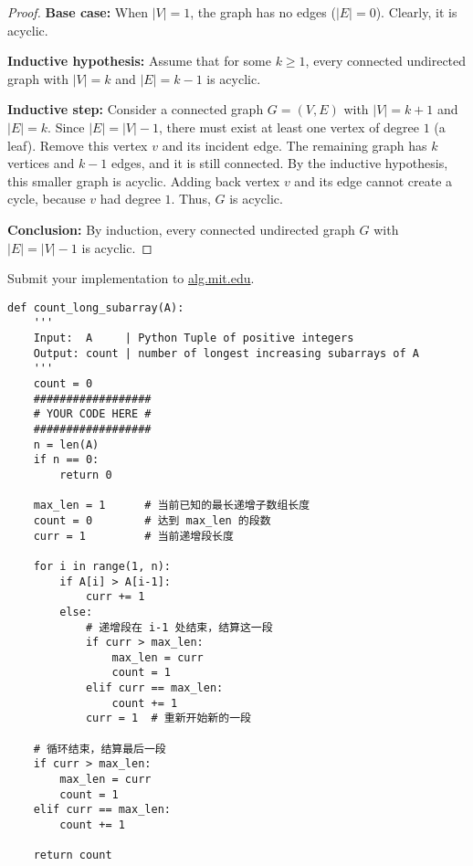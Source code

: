 \documentclass[12pt,twoside]{article}
\begin{document}
\begin{problems}
\begin{proof}
\textbf{Base case:}  
When $|V|=1$, the graph has no edges ($|E|=0$). Clearly, it is acyclic.  

\textbf{Inductive hypothesis:}  
Assume that for some $k \geq 1$, every connected undirected graph with $|V|=k$ and $|E|=k-1$ is acyclic.  

\textbf{Inductive step:}  
Consider a connected graph $G=(V,E)$ with $|V|=k+1$ and $|E|=k$.  
Since $|E|=|V|-1$, there must exist at least one vertex of degree $1$ (a leaf).  
Remove this vertex $v$ and its incident edge.  
The remaining graph has $k$ vertices and $k-1$ edges, and it is still connected.  
By the inductive hypothesis, this smaller graph is acyclic.  
Adding back vertex $v$ and its edge cannot create a cycle, because $v$ had degree $1$.  
Thus, $G$ is acyclic.  

\textbf{Conclusion:}  
By induction, every connected undirected graph $G$ with $|E| = |V|-1$ is acyclic.  
\end{proof}

\vfill
\problem  %


Submit your implementation to {\small\url{alg.mit.edu}}.

\begin{lstlisting}
def count_long_subarray(A):
    '''
    Input:  A     | Python Tuple of positive integers
    Output: count | number of longest increasing subarrays of A
    '''
    count = 0
    ##################
    # YOUR CODE HERE #
    ##################
    n = len(A)
    if n == 0:
        return 0

    max_len = 1      # 当前已知的最长递增子数组长度
    count = 0        # 达到 max_len 的段数
    curr = 1         # 当前递增段长度

    for i in range(1, n):
        if A[i] > A[i-1]:
            curr += 1
        else:
            # 递增段在 i-1 处结束，结算这一段
            if curr > max_len:
                max_len = curr
                count = 1
            elif curr == max_len:
                count += 1
            curr = 1  # 重新开始新的一段

    # 循环结束，结算最后一段
    if curr > max_len:
        max_len = curr
        count = 1
    elif curr == max_len:
        count += 1

    return count

\end{lstlisting}

\end{problems}
\end{document}
